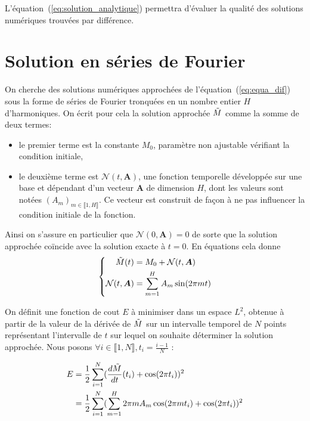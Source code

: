 \documentclass[12pt]{report}
\begin{document}
L'équation~(\ref{eq:solution_analytique}) permettra d'évaluer la qualité des solutions numériques trouvées par différence.

\section{Solution en séries de Fourier}
\label{sec:sol_ser_fourier_1d}

On cherche des solutions numériques approchées de l'équation~(\ref{eq:equa_dif}) sous la forme de séries de Fourier tronquées en un nombre entier $H$ d'harmoniques.
On écrit pour cela la solution approchée $\Tilde{M}$ comme la somme de deux termes: 
\begin{itemize}
    \item le premier terme est la constante $M_0$, paramètre non ajustable vérifiant la condition initiale,
    \item le deuxième terme est $\mathcal{N}(t,\bm{A})$, une fonction temporelle développée sur une base et dépendant d'un vecteur ${\bm A}$ de dimension $H$, dont les valeurs sont notées $(A_m)_{m\in \llbracket 1,H \rrbracket}$.
    Ce vecteur est construit de façon à ne pas influencer la condition initiale de la fonction.
\end{itemize}
Ainsi on s'assure en particulier que $\mathcal{N}(0,\bm{A})=0$ de sorte que la solution approchée coïncide avec la solution exacte à $t=0$. 
En équations cela donne
\begin{equation}
    \left\{
    \begin{aligned}
        \Tilde{M}(t)            & = M_0 + {\mathcal{N}}(t,\bm{A})     \\
        {\mathcal{N}}(t,\bm{A}) & = \sum_{m=1}^{H} A_m \sin(2\pi m t)
    \end{aligned}
    \right.
    \label{eq:solution_fourier}
\end{equation}

On définit une fonction de cout $E$ à minimiser dans un espace $L^2$, obtenue à partir de la valeur de la dérivée de $\Tilde{M}$ sur un intervalle temporel de $N$ points représentant l'intervalle de $t$ sur lequel on souhaite déterminer la solution approchée. 
Nous posons $\forall i \in\llbracket 1,N \rrbracket, t_i = \frac{i-1}{N} $ :

\begin{equation}
    \begin{aligned}
        E & = \frac{1}{2}\sum_{i=1}^{N} (\frac{d\Tilde{M}}{dt}(t_i) +\cos(2\pi t_i))^2               \\
          & = \frac{1}{2}\sum_{i=1}^{N}(\sum_{m=1}^{H} 2\pi m A_m \cos(2\pi m t_i)+\cos(2\pi t_i))^2
    \end{aligned}
    \label{eq:fonction_erreur}
\end{equation}
\end{document}
